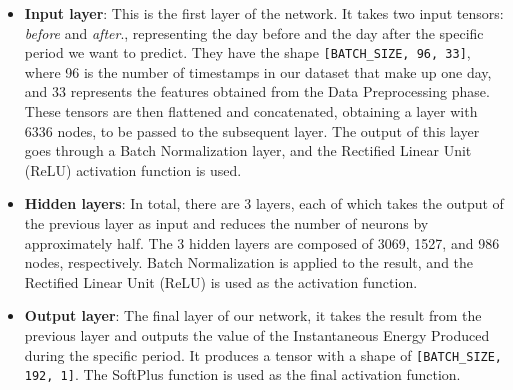 \begin{itemize}
	\item \textbf{Input layer}: This is the first layer of the network.
	      It takes two input tensors: \textit{before} and \textit{after}., representing the day before and the day after the specific period we want to
	      predict. They have the shape \verb|[BATCH_SIZE, 96, 33]|, where 96 is the number
	      of timestamps in our dataset that make up one day, and 33 represents the
	      features obtained from the Data Preprocessing phase.
	      These tensors are then flattened and concatenated, obtaining a layer with 6336 nodes, to be passed to the subsequent layer.
	      The output of this layer goes through a Batch Normalization \cite{batchnorm} layer, and the
	      Rectified Linear Unit (ReLU) \cite{functions} activation function is used.


	\item \textbf{Hidden layers}: In total, there are 3 layers, each of which takes the
	      output of the previous layer as input and reduces the number of neurons by approximately half. The 3 hidden layers are composed of 3069, 1527, and 986 nodes, respectively.
	      Batch Normalization \cite{batchnorm} is applied to the result, and the Rectified Linear Unit (ReLU) \cite{functions}
	      is used as the activation function.


	\item \textbf{Output layer}: The final layer of our network, it takes the result from the
	      previous layer and outputs the value of the Instantaneous Energy Produced
	      during the specific period.
	      It produces a tensor with a shape of \verb|[BATCH_SIZE, 192, 1]|.
	      The SoftPlus \cite{functions} function is used as the final activation function.


\end{itemize}

